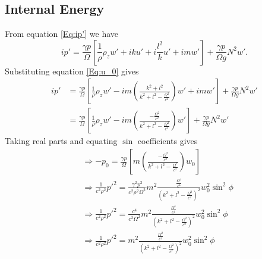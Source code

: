 \documentclass[12pt]{article}
\begin{document}
\subsection{Internal Energy}
From equation \ref{Eq:ip'} we have 
\begin{equation}
ip' = \frac{\gamma p}{\Omega} \left[ \frac{1}{\rho} \rho_z w' + iku' + i\frac{l^2}{k}u' + im w' \right] + \frac{\gamma p}{\Omega g} N^2 w'.
\end{equation}
Substituting equation \ref{Eq:u_0} gives
\begin{align}
ip' & = \frac{\gamma p}{\Omega} \left[ \frac{1}{\rho} \rho_z w' - im\left(  \frac{k^2 + l^2}{k^2 + l^2 - \frac{ \Omega ^2}{c^2} }\right)w' + im w' \right] + \frac{\gamma p}{\Omega g} N^2 w' \\ 
&= \frac{\gamma p}{\Omega} \left[ \frac{1}{\rho} \rho_z w' - im\left(  \frac{-\frac{\Omega^2}{c^2}}{k^2 + l^2 - \frac{ \Omega ^2}{c^2} }\right) w' \right] + \frac{\gamma p}{\Omega g} N^2 w'
\end{align}
Taking real parts and equating $\sin$ coefficients gives
\begin{align}
& \Rightarrow -p_0 = \frac{\gamma p}{\Omega} \left[m\left(  \frac{-\frac{\Omega^2}{c^2}}{k^2 + l^2 - \frac{ \Omega ^2}{c^2} }\right) w_0 \right] \\
& \Rightarrow \frac{1}{c^2 \rho^2} p'^2 = \frac{\gamma^2 p^2}{c^2 \rho^2 \Omega^2} m^2 \frac{\frac{\Omega^4}{c^4}}{\left(k^2 + l^2 - \frac{ \Omega ^2}{c^2}\right)^2 } w_0^2 \sin^2\phi \\
& \Rightarrow \frac{1}{c^2 \rho^2} p'^2 = \frac{c^4}{c^2 \Omega^2} m^2 \frac{\frac{\Omega^4}{c^4}}{\left(k^2 + l^2 - \frac{ \Omega ^2}{c^2}\right)^2 } w_0^2 \sin^2\phi \\
& \Rightarrow \frac{1}{c^2 \rho^2} p'^2 =  m^2 \frac{\frac{\Omega^2}{c^2}}{\left(k^2 + l^2 - \frac{ \Omega ^2}{c^2}\right)^2 } w_0^2 \sin^2\phi   
\end{align}

\end{document}
